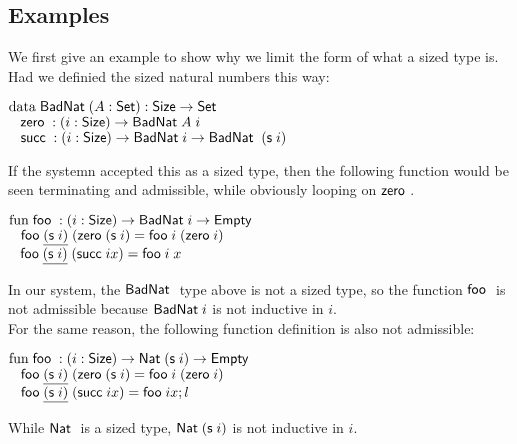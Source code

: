 \subsection{Examples}
We first give an example to show why we limit the form of what a sized type is.
Had we definied the sized natural numbers this way:
\begin{bsp}
$\data \BadNat ( A : \Set ) : \Size \ra \Set $ \\
$\spc \zero : \EPi{i}{\Size}{ \BadNat A \; i} $\\
$\spc \suc : \EPi{i}{\Size}{\BadNat i \ra \BadNat \; (\s i)} $
\end{bsp}
If the systemn accepted this as a sized type, then the following function would be seen terminating and admissible, while obviously looping on $\zero$.
\begin{bsp}
$\fun \foo : \EPi{i}{\Size}{\BadNat i \ra \Empty}$\\
$\spc \foo \inacc{(\s i)} \; (\zero (\s i) = \foo i \; (\zero i)$\\
$\spc \foo \inacc{(\s i)}\; (\suc i x) = \foo i \; x$
\end{bsp}
In our system, the $\BadNat$ type above is not a sized type, so the function $\foo$ is not admissible because $\BadNat i$ is not inductive in $i$.\\
For the same reason, the following function definition is also not admissible:
\begin{bsp}
$\fun \foo : \EPi{i}{\Size}{\Nat (\s i) \ra \Empty}$\\
$\spc \foo \inacc{(\s i)} \; (\zero (\s i) = \foo i \; (\zero i)$\\
$\spc \foo \inacc{(\s i)}\; (\suc i x) = \foo i x; l$
\end{bsp}
While $\Nat$ is a sized type, $\Nat (\s i)$ is not inductive in $i$.
